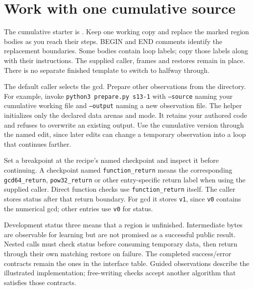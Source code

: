 \section{Work with one cumulative source}
The cumulative starter is . Keep one working
copy and replace the marked region bodies as you reach their steps. BEGIN and END
comments identify the replacement boundaries. Some bodies contain loop labels; copy
those labels along with their instructions. The supplied caller, frames and restores
remain in place. There is no separate finished template to switch to halfway through.

The default caller selects the gcd. Prepare other observations from the
 directory. For example, invoke \texttt{python3 prepare.py s13-1}
with \texttt{--source} naming your cumulative working file and \texttt{--output} naming
a new observation file. The helper initializes only the declared data arenas and mode.
It retains your authored code and refuses to overwrite an existing output. Use the
cumulative version through the named edit, since later edits can change a temporary
observation into a loop that continues farther.

Set a breakpoint at the recipe's named checkpoint and inspect it before continuing.
A checkpoint named \texttt{function\_return} means the corresponding
\texttt{gcd64\_return}, \texttt{pow32\_return} or other entry-specific return label when
using the supplied caller. Direct function checks use \texttt{function\_return} itself.
The caller stores status after that return boundary. For gcd it stores \texttt{v1},
since \texttt{v0} contains the numerical gcd; other entries use \texttt{v0} for status.

Development status three means that a region is unfinished. Intermediate bytes are
observable for learning but are not promised as a successful public result. Nested
calls must check status before consuming temporary data, then return through their own
matching restore on failure. The completed success/error contracts remain the ones in
the interface table. Guided observations describe the illustrated implementation;
free-writing checks accept another algorithm that satisfies those contracts.
